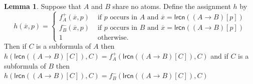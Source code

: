 \documentclass{amsart}
\theoremstyle{definition}
\newtheorem{lemma}{Lemma}
\newcommand{\lrcn}{\mathsf{lrcn}}
\begin{document}
\begin{lemma}\label{Lemma:h-definition}
    Suppose that $A$ and $B$ share no atoms. Define the assignment $h$ by
    \[
        h(\overline{x},p)=\left\{
        \begin{array}{rl}
            f^+_A(\overline{x}, p) & \text{ if } p \text{ occurs in $A$ and $\overline{x}=\lrcn((A\to B)[p])$} \\
            f^-_B(\overline{x}, p) & \text{ if } p \text{ occurs in $B$ and $\overline{x}=\lrcn((A\to B)[p])$} \\
            1 & \text{ otherwise}.
        \end{array}\right.
    \]
    Then if $C$ is a subformula of $A$ then $h(\lrcn((A\to B)[C]),C)=f^+_A(\lrcn((A\to B)[C]),C)$ and if $C$ is a subformula of $B$ then $h(\lrcn((A\to B)[C]),C)=f^-_B(\lrcn((A\to B)[C]),C)$
\end{lemma}
\end{document}
